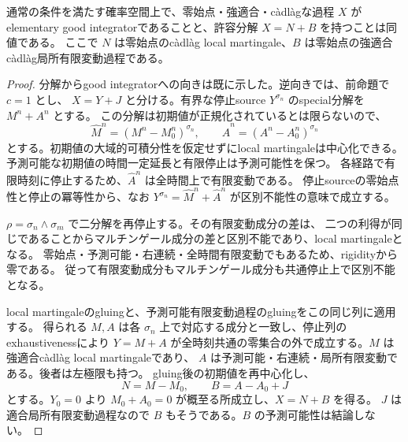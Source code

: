 \begin{theorem}\label{thm:regular-gi-decomposition}
通常の条件を満たす確率空間上で、零始点・強適合・càdlàgな過程 $X$ が
elementary good integratorであることと、許容分解 $X=N+B$ を持つことは同値である。
ここで $N$ は零始点のcàdlàg local martingale、$B$ は零始点の強適合càdlàg局所有限変動過程である。
\end{theorem}
\begin{proof}
分解からgood integratorへの向きは既に示した。逆向きでは、前命題で $c=1$ とし、
$X=Y+J$ と分ける。有界な停止source $Y^{\sigma_n}$ のspecial分解を $M^n+A^n$ とする。
この分解は初期値が正規化されているとは限らないので、
\[
 \widehat M^n=(M^n-M^n_0)^{\sigma_n},\qquad
 \widehat A^n=(A^n-A^n_0)^{\sigma_n}
\]
とする。初期値の大域的可積分性を仮定せずにlocal martingaleは中心化できる。
予測可能な初期値の時間一定延長と有限停止は予測可能性を保つ。
各経路で有限時刻に停止するため、$\widehat A^n$ は全時間上で有限変動である。
停止sourceの零始点性と停止の冪等性から、なお
$Y^{\sigma_n}=\widehat M^n+\widehat A^n$ が区別不能性の意味で成立する。

$\rho=\sigma_n\wedge\sigma_m$ で二分解を再停止する。その有限変動成分の差は、
二つの利得が同じであることからマルチンゲール成分の差と区別不能であり、local martingaleとなる。
零始点・予測可能・右連続・全時間有限変動でもあるため、rigidityから零である。
従って有限変動成分もマルチンゲール成分も共通停止上で区別不能となる。

local martingaleのgluingと、予測可能有限変動過程のgluingをこの同じ列に適用する。
得られる $M,A$ は各 $\sigma_n$ 上で対応する成分と一致し、停止列のexhaustivenessにより
$Y=M+A$ が全時刻共通の零集合の外で成立する。$M$ は強適合càdlàg local martingaleであり、
$A$ は予測可能・右連続・局所有限変動である。後者は左極限も持つ。
gluing後の初期値を再中心化し、
\[
 N=M-M_0,\qquad B=A-A_0+J
\]
とする。$Y_0=0$ より $M_0+A_0=0$ が概至る所成立し、$X=N+B$ を得る。
$J$ は適合局所有限変動過程なので $B$ もそうである。$B$ の予測可能性は結論しない。
\end{proof}

